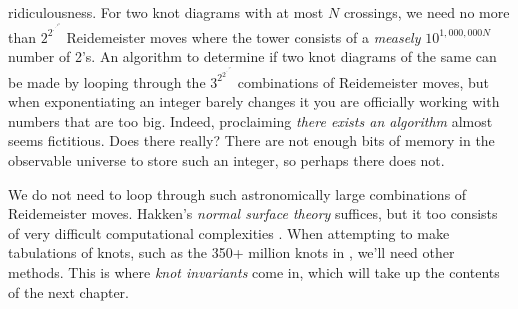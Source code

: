     ridiculousness. For two knot diagrams with at most $N$ crossings, we need
    no more than $2^{2^{\cdot^{\cdot^{\cdot^{{2^{N}}}}}}}$ Reidemeister moves
    where the tower consists of a \textit{measely}
    $10^{1,000,000N}$ number of 2's. An algorithm to determine if two knot
    diagrams of the same can be made by looping through the
    $3^{2^{2^{\cdot^{\cdot^{\cdot^{{2^{N}}}}}}}}$ combinations of Reidemeister
    moves, but when exponentiating an integer barely changes it
    you are officially working with numbers that are too big. Indeed,
    proclaiming \textit{there exists an algorithm} almost seems fictitious.
    Does there really? There are not enough bits of memory in the observable
    universe to store such an integer, so perhaps there does not.
    \par\hfill\par
    We do not need to loop through such astronomically large combinations of
    Reidemeister moves. Hakken's \textit{normal surface theory} suffices,
    but it too consists of very difficult computational complexities
    \cite{HASS1998569}. When attempting to make tabulations of knots,
    such as the 350+ million knots in \cite{Burton2020TheN3}, we'll need
    other methods. This is where \textit{knot invariants} come in, which will
    take up the contents of the next chapter.
